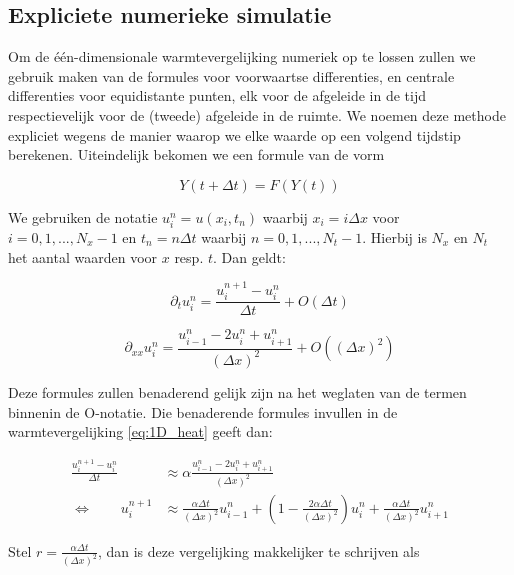 \documentclass[a4paper,kulak]{kulakarticle} %
\begin{document}
\subsection{Expliciete numerieke simulatie}

Om de één-dimensionale warmtevergelijking numeriek op te lossen zullen we gebruik maken van de formules voor voorwaartse differenties, en centrale differenties voor equidistante punten, elk voor de afgeleide in de tijd respectievelijk voor de (tweede) afgeleide in de ruimte. %
We noemen deze methode expliciet wegens de manier waarop we elke waarde op een volgend tijdstip berekenen. Uiteindelijk bekomen we een formule van de vorm %

\begin{equation*}
	Y(t + \Delta t) = F(Y(t))
\end{equation*}

We gebruiken de notatie $u_i^n = u(x_i, t_n)$ waarbij $x_i = i\Delta x$ voor $i = 0, 1, ..., N_x-1$ en $t_n = n\Delta t$ waarbij $n = 0, 1, ..., N_t - 1$. Hierbij is $N_x$ en $N_t$ het aantal waarden voor $x$ resp. $t$.
Dan geldt:

\begin{equation}
	\partial_t u_i^n = \frac{u_i^{n+1} - u_i^n}{\Delta t} + O(\Delta t)
	\label{eq:diff_time}
\end{equation}

\begin{equation}
	\partial_{xx} u_i^n = \frac{u_{i-1}^n - 2 u_i^n + u_{i+1}^n}{(\Delta x)^2} + O((\Delta x)^2)
	\label{eq:diff_space}
\end{equation}

Deze formules zullen benaderend gelijk zijn na het weglaten van de termen binnenin de O-notatie. Die benaderende formules invullen in de warmtevergelijking \ref{eq:1D_heat} geeft dan:

\begin{align*}
	\frac{u_i^{n+1} - u_i^n}{\Delta t} &\approx \alpha \frac{u_{i-1}^n - 2 u_i^n + u_{i+1}^n}{(\Delta x)^2} \\
	\Leftrightarrow \qquad u_i^{n+1} &\approx \frac{\alpha \Delta t}{(\Delta x)^2} u_{i-1}^n + \left( 1 - \frac{2 \alpha \Delta t}{(\Delta x)^2} \right) u_i^n + \frac{\alpha \Delta t}{(\Delta x)^2} u_{i+1}^n 
\end{align*}

Stel $r = \frac{\alpha \Delta t}{(\Delta x)^2}$, dan is deze vergelijking makkelijker te schrijven als
\end{document}
